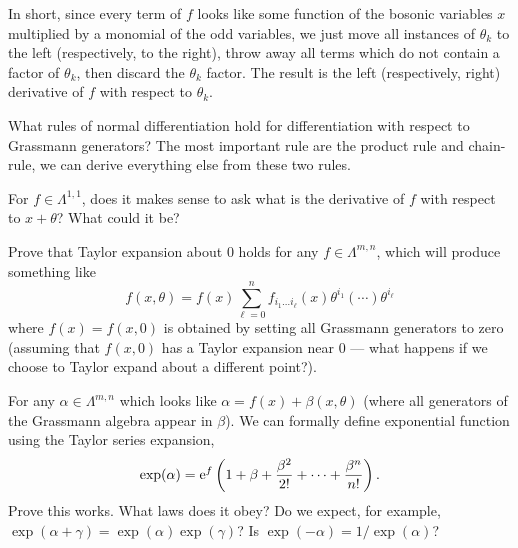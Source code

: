 In short, since every term of $f$ looks like some function of the
bosonic variables $x$ multiplied by a monomial of the odd variables, we
just move all instances of $\theta_{k}$ to the left (respectively, to the right), throw
away all terms which do not contain a factor of $\theta_{k}$, then
discard the $\theta_{k}$ factor. The result is the left (respectively,
right) derivative of $f$ with respect to $\theta_{k}$.

\begin{puzzle}
What rules of normal differentiation hold for differentiation with
respect to Grassmann generators? The most important rule are the product
rule and chain-rule, we can derive everything else from these two rules.
\end{puzzle}


\begin{puzzle}
For $f\in\Lambda^{1,1}$, does it makes sense to ask what is the
derivative of $f$ with respect to $x+\theta$? What could it be?
\end{puzzle}

\begin{exercise}
Prove that Taylor expansion about 0 holds for any $f\in\Lambda^{m,n}$, which
will produce something like
\begin{equation}
f(x,\theta) = f(x)\sum^{n}_{\ell=0}f_{i_{1}\dots i_{\ell}}(x)\theta^{i_{1}}(\cdots)\theta^{i_{\ell}}
\end{equation}
where $f(x)=f(x,0)$ is obtained by setting all Grassmann generators to
zero (assuming that $f(x,0)$ has a Taylor expansion near $0$ --- what
happens if we choose to Taylor expand about a different point?).
\end{exercise}


\begin{exercise}\label{xca:differentiation:taylor-series-for-exp}
For any $\alpha\in\Lambda^{m,n}$ which looks like
$\alpha=f(x)+\beta(x,\theta)$ (where all generators of the
Grassmann algebra appear in $\beta$). We can formally define exponential
function using the Taylor series expansion,
\begin{equation}
\exp(\alpha) = \mathrm{e}^{f}\left(1 + \beta + \frac{\beta^{2}}{2!} + \dots + \frac{\beta^{n}}{n!}\right).
\end{equation}
Prove this works. What laws does it obey? Do we expect, for example, $\exp(\alpha+\gamma)=\exp(\alpha)\exp(\gamma)$?
Is $\exp(-\alpha)=1/\exp(\alpha)$?
\end{exercise}

